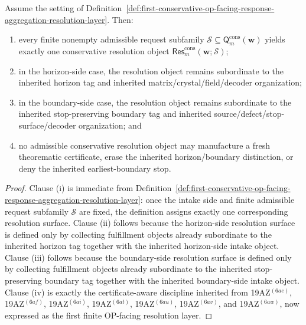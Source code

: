 \begin{proposition}
\label{prop:every-finite-admissible-conservative-fulfillment-family-yields-exactly-one-route-faithful-conservative-resolution-object}
Assume the setting of Definition~\ref{def:first-conservative-op-facing-response-aggregation-resolution-layer}. Then:
\begin{enumerate}[label=(\roman*)]
 \item every finite nonempty admissible request subfamily \(\mathcal S\subseteq \mathsf{Q}^{\mathrm{cons}}_{m}(\mathbf w)\) yields exactly one conservative resolution object \(\mathsf{Res}^{\mathrm{cons}}_{m}(\mathbf w;\mathcal S)\);
 \item in the horizon-side case, the resolution object remains subordinate to the inherited horizon tag and inherited matrix/crystal/field/decoder organization;
 \item in the boundary-side case, the resolution object remains subordinate to the inherited stop-preserving boundary tag and inherited source/defect/stop-surface/decoder organization; and
 \item no admissible conservative resolution object may manufacture a fresh theorematic certificate, erase the inherited horizon/boundary distinction, or deny the inherited earliest-boundary stop.
\end{enumerate}
\end{proposition}

\begin{proof}
Clause (i) is immediate from Definition~\ref{def:first-conservative-op-facing-response-aggregation-resolution-layer}: once the intake side and finite admissible request subfamily \(\mathcal S\) are fixed, the definition assigns exactly one corresponding resolution surface. Clause (ii) follows because the horizon-side resolution surface is defined only by collecting fulfillment objects already subordinate to the inherited horizon tag together with the inherited horizon-side intake object. Clause (iii) follows because the boundary-side resolution surface is defined only by collecting fulfillment objects already subordinate to the inherited stop-preserving boundary tag together with the inherited boundary-side intake object. Clause (iv) is exactly the certificate-aware discipline inherited from 19AZ$^{(6ae)}$, 19AZ$^{(6af)}$, 19AZ$^{(6ai)}$, 19AZ$^{(6at)}$, 19AZ$^{(6au)}$, 19AZ$^{(6av)}$, and 19AZ$^{(6aw)}$, now expressed as the first finite OP-facing resolution layer.
\end{proof}

